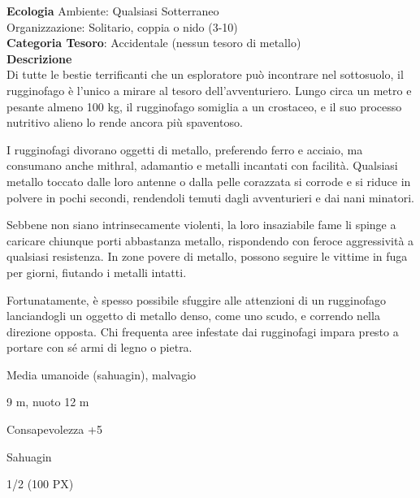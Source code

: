 \begin{multicols}{2}
{\textbf{Ecologia}
Ambiente: Qualsiasi Sotterraneo\\
Organizzazione: Solitario, coppia o nido (3-10)\\
\textbf{Categoria Tesoro}: Accidentale (nessun tesoro di metallo)\\
\textbf{Descrizione}\\
Di tutte le bestie terrificanti che un esploratore può incontrare nel sottosuolo, il rugginofago è l'unico a mirare al tesoro dell'avventuriero. Lungo circa un metro e pesante almeno 100 kg, il rugginofago somiglia a un crostaceo, e il suo processo nutritivo alieno lo rende ancora più spaventoso.

I rugginofagi divorano oggetti di metallo, preferendo ferro e acciaio, ma consumano anche mithral, adamantio e metalli incantati con facilità. Qualsiasi metallo toccato dalle loro antenne o dalla pelle corazzata si corrode e si riduce in polvere in pochi secondi, rendendoli temuti dagli avventurieri e dai nani minatori.

Sebbene non siano intrinsecamente violenti, la loro insaziabile fame li spinge a caricare chiunque porti abbastanza metallo, rispondendo con feroce aggressività a qualsiasi resistenza. In zone povere di metallo, possono seguire le vittime in fuga per giorni, fiutando i metalli intatti.

Fortunatamente, è spesso possibile sfuggire alle attenzioni di un rugginofago lanciandogli un oggetto di metallo denso, come uno scudo, e correndo nella direzione opposta. Chi frequenta aree infestate dai rugginofagi impara presto a portare con sé armi di legno o pietra.


\begin{description}[noitemsep, topsep=0pt, parsep=0pt, partopsep=0pt, itemsep=1pt, leftmargin=2.35cm,  labelwidth=2.2cm, itemindent=0cm, listparindent=0pt] %
\setlength{\baselineskip}{10pt}
\item[\textbf{Taglia/Tipo}] Media umanoide (sahuagin), malvagio
\item[\textbf{Caratt.}] 
\item[\textbf{Punti Ferita}] 
\item[\textbf{Movimento}] 9 m, nuoto 12 m
\item[\textbf{Tiri Salvez.}] 
\item[\textbf{Comp.}] Consapevolezza +5
\item[\textbf{Sensi}] 
\item[\textbf{Linguaggi}] Sahuagin
\item[\textbf{Sfida}] 1/2 (100 PX)
\end{description}
\smallskip

}
\end{multicols}
